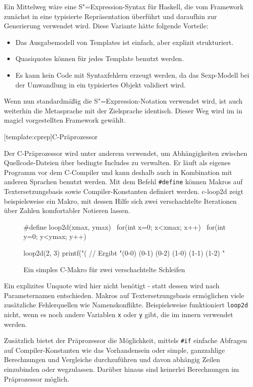 \documentclass[11pt, a4paper, bibgerm]{book}
\newcommand\icode[1]{\lstinline?#1?}
\newcommand\lsection{}
\newcommand\cref{}
\newcommand\abb{}
\newcommand{\sexp}{S"=Expression}
\begin{document}
Ein Mittelweg wäre eine \sexp{}-Syntax für Haskell, die vom Framework
zunächst in eine typisierte Repräsentation überführt und daraufhin zur
Generierung verwendet wird. Diese Variante hätte folgende Vorteile:
\begin{itemize}
\item Das Ausgabemodell von Templates ist einfach, aber explizit
  strukturiert.
\item Quasiquotes können für jedes Template benutzt werden.
\item Es kann kein Code mit Syntaxfehlern erzeugt werden, da das
  Sexp-Modell bei der Umwandlung in ein typisiertes Objekt validiert wird.
\end{itemize}
Wenn nun standardmäßig die \sexp{}-Notation verwendet wird, ist auch
weiterhin die Metasprache mit der Zielsprache identisch. Dieser Weg
wird im in \cref{magicl} vorgestellten Framework gewählt.

\lsection[template:cprep]{C-Präprozessor}

Der C-Präprozessor wird unter anderem verwendet, um Abhängigkeiten
zwischen Quellcode-Dateien über bedingte Includes zu verwalten. Er läuft
als eigenes Programm vor dem C-Compiler und kann deshalb auch in
Kombination mit anderen Sprachen benutzt werden. Mit dem Befehl
\icode{#define} können Makros auf Textersetzungsbasis sowie
Compiler-Konstanten definiert werden. \abb{c-loop2d} zeigt
beispielsweise ein Makro, mit dessen Hilfe sich zwei verschachtelte
Iterationen über Zahlen komfortabler Notieren lassen.
\begin{figure}
  \centering
  \begin{code}
#define loop2d(xmax, ymax)   \
  for(int x=0; x<xmax; x++)  \
   for(int y=0; y<ymax; y++)

loop2d(2, 3) {
  printf("(%
}
// Ergibt "(0-0) (0-1) (0-2) (1-0) (1-1) (1-2) "
  \end{code}
\caption{Ein simples C-Makro für zwei verschachtelte Schleifen}
  \label{magicl:fig:c-loop2d}
\end{figure}
Ein explizites Unquote wird hier nicht benötigt - statt dessen wird nach
Parameternamen entschieden. Makros auf Textersetzungsbasis ermöglichen
viele zusätzliche Fehlerquellen wie Namenskonflikte. Beispielsweise
funktioniert \icode{loop2d} nicht, wenn es noch andere Variablen
\icode{x} oder \icode{y} gibt, die im innern verwendet werden.

Zusätzlich bietet der Präprozessor die Möglichkeit, mittels \icode{#if}
einfache Abfragen auf Compiler-Konstanten wie das Vorhandensein oder
simple, ganzzahlige Berechnungen und Vergleiche durchzuführen und davon
abhängig Zeilen einzubinden oder wegzulassen. Darüber hinaus sind
keinerlei Berechnungen im Präprozessor möglich.
\end{document}
